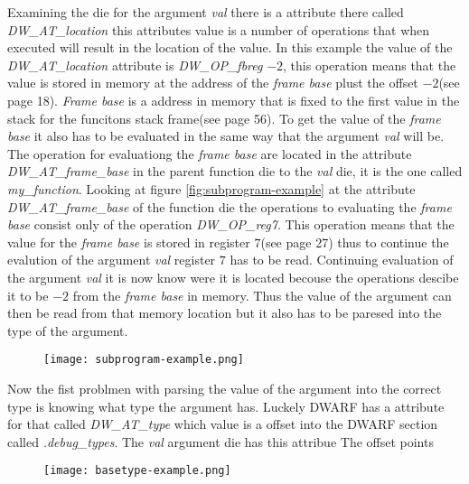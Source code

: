 Examining the \gls{die} for the argument \emph{val} there is a attribute there called \emph{DW\_AT\_location} this attributes value is a number of operations that when executed will result in the location of the value.
In this example the value of the \emph{DW\_AT\_location} attribute is \emph{DW\_OP\_fbreg} $-2$, this operation means that the value is stored in memory at the address of the \emph{frame base} plust the offset $-2$(see \cite{dwarf} page 18).
\emph{Frame base} is a address in memory that is fixed to the first value in the stack for the funcitons stack frame(see \cite{dwarf} page 56).
To get the value of the \emph{frame base} it also has to be evaluated in the same way that the argument \emph{val} will be.
The operation for evaluationg the \emph{frame base} are located in the attribute \emph{DW\_AT\_frame\_base} in the parent function \gls{die} to the \emph{val} die, it is the one called \emph{my\_function}.
Looking at figure \ref{fig:subprogram-example} at the attribute \emph{DW\_AT\_frame\_base} of the function \gls{die} the operations to evaluating the \emph{frame base} consist only of the operation \emph{DW\_OP\_reg7}.
This operation means that the value for the \emph{frame base} is stored in register $7$(see \cite{dwarf} page 27) thus to continue the evalution of the argument \emph{val} register $7$ has to be read.
Continuing evaluation of the argument \emph{val} it is now know were it is located becouse the operations descibe it to be $-2$ from the \emph{frame base} in memory.
Thus the value of the argument can then be read from that memory location but it also has to be paresed into the type of the argument.


\begin{figure}[h]
    \centering
    \texttt{[image: subprogram-example.png]}
    \label{fig:subprogramexample}
\end{figure}


Now the fist problmen with parsing the value of the argument into the correct type is knowing what type the argument has.
Luckely \gls{DWARF} has a attribute for that called \emph{DW\_AT\_type} which value is a offset into the \gls{DWARF} section called \emph{.debug\_types}.
The \emph{val} argument die has this attribue
The offset points 


\begin{figure}[h]
    \centering
    \texttt{[image: basetype-example.png]}
    \label{fig:basetypeexample}
\end{figure}

